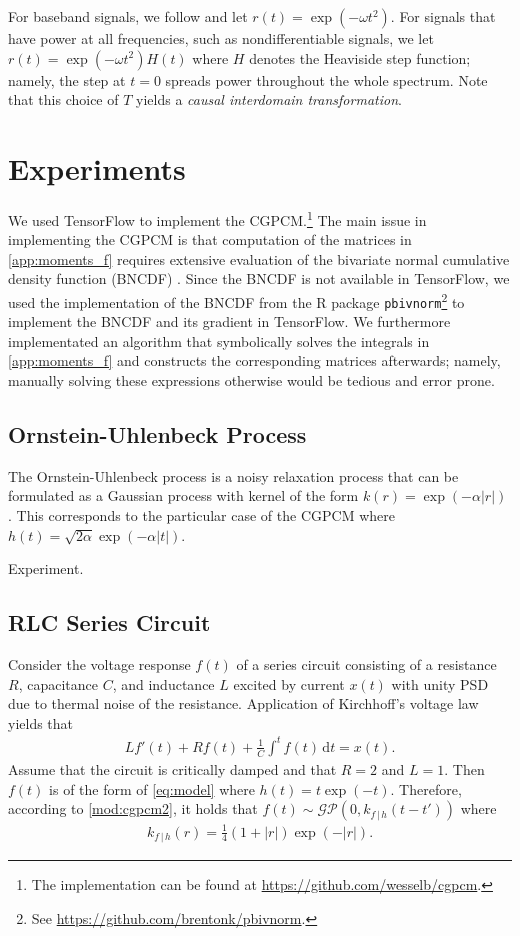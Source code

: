 \documentclass{article}
\newcommand{\id}[1]{\, \mathrm{d} #1}     %
\newcommand{\cond}{\, | \,}               %
\begin{document}
For baseband signals, we follow \citet{Tobar:2015:Learning_Stationary} and let $r(t)=\exp(-\omega t^2)$. For signals that have power at all frequencies, such as nondifferentiable signals, we let $r(t)=\exp(- \omega t^2)H(t)$ where $H$ denotes the Heaviside step function; namely, the step at $t=0$ spreads power throughout the whole spectrum. Note that this choice of $T$ yields a \textit{causal interdomain transformation}.

\section{Experiments}
We used TensorFlow \cite{Abadi:2016:TensorFlow_A_System_for_Large-Scale} to implement the CGPCM.\footnote{The implementation can be found at \url{https://github.com/wesselb/cgpcm}.} The main issue in implementing the CGPCM is that computation of the matrices in \cref{app:moments_f} requires extensive evaluation of the bivariate normal cumulative density function (BNCDF) \cite{Genz:2004:Numerical_Computation_of_Rectangular_Bivariate}. Since the BNCDF is not available in TensorFlow, we used the implementation of the BNCDF from the R package \texttt{pbivnorm}\footnote{See \url{https://github.com/brentonk/pbivnorm}.} to implement the BNCDF and its gradient in TensorFlow. We furthermore implementated an algorithm that symbolically solves the integrals in \cref{app:moments_f} and constructs the corresponding matrices afterwards; namely, manually solving these expressions  otherwise would be tedious and error prone.

\subsection{Ornstein-Uhlenbeck Process}
The Ornstein-Uhlenbeck process is a noisy relaxation process that can be formulated as a Gaussian process with kernel of the form $k(r)=\exp(- \alpha |r|)$ \cite{Rasmussen:2006:Gaussian_Processes}. This corresponds to the particular case of the CGPCM where $h(t)=\sqrt{2 \alpha} \exp(- \alpha |t|)$.

{\color{red} Experiment.}

\subsection{RLC Series Circuit}
Consider the voltage response $f(t)$ of a series circuit consisting of a resistance $R$, capacitance $C$, and inductance $L$ excited by current $x(t)$ with unity PSD due to thermal noise of the resistance. Application of Kirchhoff's voltage law \cite{Irwin:2010:Basic_Engineering_Circuit_Analysis} yields that
\begin{align*}
     L f'(t) + R f(t)+\frac{1}{C}\int^t f(t)\id{t} = x(t).
\end{align*}
Assume that the circuit is critically damped and that $R=2$ and $L=1$. Then $f(t)$ is of the form of \cref{eq:model} where $h(t) = t \exp(-t)$. Therefore, according to \cref{mod:cgpcm2}, it holds that $f(t) \sim \mathcal{GP}(0,k_{f\cond h}(t-t'))$ where
\begin{align*}
    k_{f\cond h}(r) = \frac{1}{4}(1+|r|)\exp(-|r|).
\end{align*}
\end{document}

